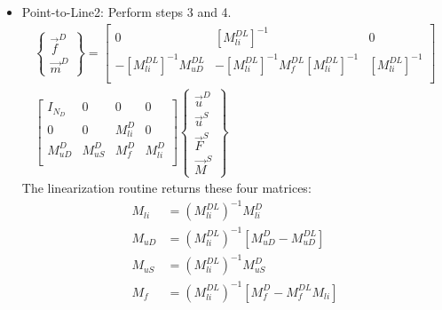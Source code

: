 \documentclass[10pt,letterpaper,oneside,notitlepage]{article}
\begin{document}
\begin{itemize}
   
  \item Point-to-Line2: Perform steps 3 and 4.
         \begin{multline}
            \left\{   \begin{matrix} \vec{f}^{D} \\ \vec{m}^{D} \end{matrix} \right\} 
           =
            \begin{bmatrix}
            0                       & \left[ M_{li}^{DL} \right]^{-1} & 0   \\
            -\left[ M_{li}^{DL} \right]^{-1} M_{uD}^{DL} & 
            -\left[ M_{li}^{DL} \right]^{-1} M_{f}^{DL} \left[ M_{li}^{DL} \right]^{-1}  &
             \left[ M_{li}^{DL} \right]^{-1} \\
            \end{bmatrix}                  \\                                 
          \begin{bmatrix}
            I_{N_D}             & 0                      & 0          & 0          \\
            0                   & 0                      & M_{li}^{D} & 0          \\
            M_{uD}^{D}          & M_{uS}^{D}             & M_{f}^{D}  & M_{li}^{D} \\
            \end{bmatrix}            
            \left\{   \begin{matrix} \vec{u}^D \\ \vec{u}^{S}  \\ \vec{F}^{S}  \\ \vec{M}^{S} \end{matrix} \right\}             
         \end{multline}            
      The linearization routine returns these four matrices:
   \begin{align} M_{li} &= \left(M_{li}^{DL}\right)^{-1}M_{li}^D \\
    M_{uD} &= \left(M_{li}^{DL}\right)^{-1}\left[M_{uD}^D - M_{uD}^{DL}\right] \\ 
    M_{uS} &= \left(M_{li}^{DL}\right)^{-1}M_{uS}^D \\ 
    M_{f}  &= \left(M_{li}^{DL}\right)^{-1}\left[M_{f}^D - M_{f}^{DL} M_{li} \right] \end{align} 


\end{itemize}
\end{document}
